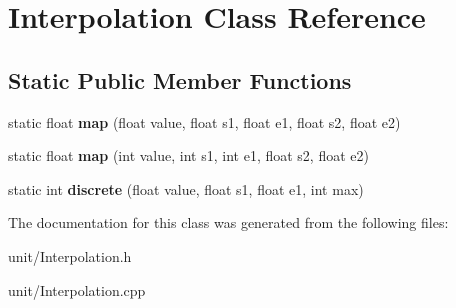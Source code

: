 \hypertarget{classInterpolation}{}\section{Interpolation Class Reference}
\label{classInterpolation}
\subsection*{Static Public Member Functions}
\begin{DoxyCompactItemize}
\item 
static float {\bfseries map} (float value, float s1, float e1, float s2, float e2)\hypertarget{classInterpolation_adfd3003c39c40ec76342274c65017761}{}\label{classInterpolation_adfd3003c39c40ec76342274c65017761}

\item 
static float {\bfseries map} (int value, int s1, int e1, float s2, float e2)\hypertarget{classInterpolation_ac6eab12deb9f79b79200aad3b219e7c3}{}\label{classInterpolation_ac6eab12deb9f79b79200aad3b219e7c3}

\item 
static int {\bfseries discrete} (float value, float s1, float e1, int max)\hypertarget{classInterpolation_a246c72a835822b7674758d657ed44230}{}\label{classInterpolation_a246c72a835822b7674758d657ed44230}

\end{DoxyCompactItemize}


The documentation for this class was generated from the following files\+:\begin{DoxyCompactItemize}
\item 
unit/Interpolation.\+h\item 
unit/Interpolation.\+cpp\end{DoxyCompactItemize}
